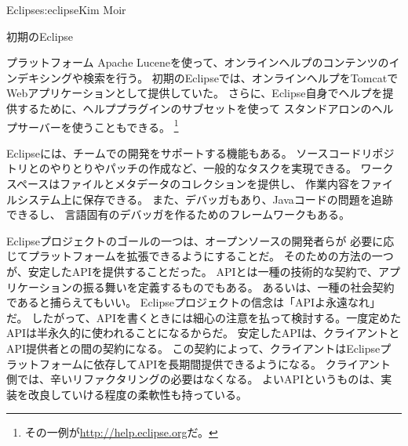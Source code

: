 \begin{aosachapter}{Eclipse}{s:eclipse}{Kim Moir}
\begin{aosasect1}{初期のEclipse}
\begin{aosasect2}{プラットフォーム}
Apache Luceneを使って、オンラインヘルプのコンテンツのインデキシングや検索を行う。
初期のEclipseでは、オンラインヘルプをTomcatでWebアプリケーションとして提供していた。
さらに、Eclipse自身でヘルプを提供するために、ヘルププラグインのサブセットを使って
スタンドアロンのヘルプサーバーを使うこともできる。
\footnote{その一例が\url{http://help.eclipse.org}だ。}

Eclipseには、チームでの開発をサポートする機能もある。
ソースコードリポジトリとのやりとりやパッチの作成など、一般的なタスクを実現できる。
ワークスペースはファイルとメタデータのコレクションを提供し、
作業内容をファイルシステム上に保存できる。
また、デバッガもあり、Javaコードの問題を追跡できるし、
言語固有のデバッガを作るためのフレームワークもある。

Eclipseプロジェクトのゴールの一つは、オープンソースの開発者らが
必要に応じてプラットフォームを拡張できるようにすることだ。
そのための方法の一つが、安定したAPIを提供することだった。
APIとは一種の技術的な契約で、アプリケーションの振る舞いを定義するものでもある。
あるいは、一種の社会契約であると捕らえてもいい。
Eclipseプロジェクトの信念は「APIよ永遠なれ」だ。
したがって、APIを書くときには細心の注意を払って検討する。一度定めたAPIは半永久的に使われることになるからだ。
安定したAPIは、クライアントとAPI提供者との間の契約になる。
この契約によって、クライアントはEclipseプラットフォームに依存してAPIを長期間提供できるようになる。
クライアント側では、辛いリファクタリングの必要はなくなる。
よいAPIというものは、実装を改良していける程度の柔軟性も持っている。


\end{aosasect2}
\end{aosasect1}
\end{aosachapter}
